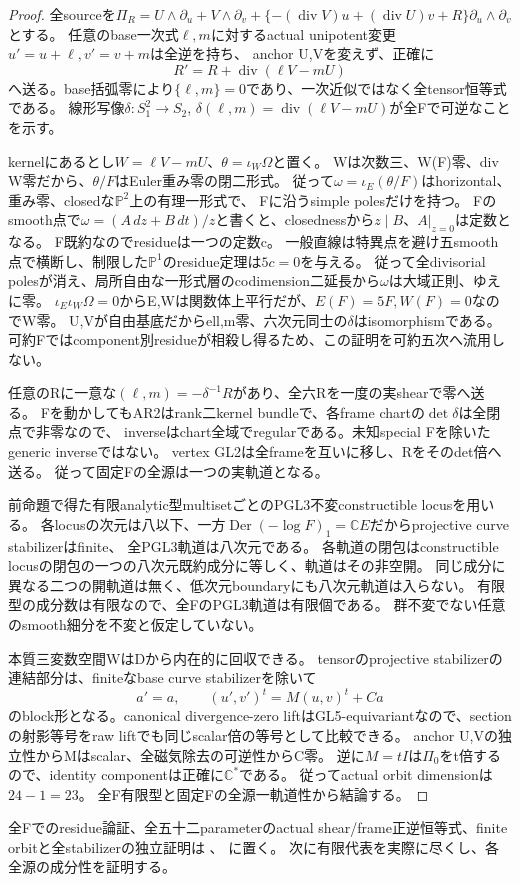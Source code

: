 \documentclass[a4paper,11pt]{ltjsarticle}
\theoremstyle{definition}
\begin{document}
\begin{proof}
全sourceを$\Pi_R=U\wedge\partial_u+V\wedge\partial_v+
\{-(\operatorname{div}V)u+(\operatorname{div}U)v+R\}\partial_u\wedge\partial_v$とする。
任意のbase一次式$\ell,m$に対するactual unipotent変更$u'=u+\ell,v'=v+m$は全逆を持ち、
anchor U,Vを変えず、正確に
\[
 R'=R+\operatorname{div}(\ell V-mU)
\]
へ送る。base括弧零により$\{\ell,m\}=0$であり、一次近似ではなく全tensor恒等式である。
線形写像$\delta:S_1^2\to S_2$, $\delta(\ell,m)=\operatorname{div}(\ell V-mU)$が全Fで可逆なことを示す。

kernelにあるとし$W=\ell V-mU$、$\theta=\iota_W\Omega$と置く。
Wは次数三、W(F)零、div W零だから、$\theta/F$はEuler重み零の閉二形式。
従って$\omega=\iota_E(\theta/F)$はhorizontal、重み零、closedな$\mathbb P^2$上の有理一形式で、
Fに沿うsimple polesだけを持つ。
Fのsmooth点で$\omega=(A\,dz+B\,dt)/z$と書くと、closednessから$z\mid B$、$A|_{z=0}$は定数となる。
F既約なのでresidueは一つの定数c。
一般直線は特異点を避け五smooth点で横断し、制限した$\mathbb P^1$のresidue定理は$5c=0$を与える。
従って全divisorial polesが消え、局所自由な一形式層のcodimension二延長から$\omega$は大域正則、ゆえに零。
$\iota_E\iota_W\Omega=0$からE,Wは関数体上平行だが、$E(F)=5F,W(F)=0$なのでW零。
U,Vが自由基底だからell,m零、六次元同士の$\delta$はisomorphismである。
可約Fではcomponent別residueが相殺し得るため、この証明を可約五次へ流用しない。

任意のRに一意な$(\ell,m)=-\delta^{-1}R$があり、全六Rを一度の実shearで零へ送る。
Fを動かしてもAR2はrank二kernel bundleで、各frame chartの$\det\delta$は全閉点で非零なので、
inverseはchart全域でregularである。未知special Fを除いたgeneric inverseではない。
vertex GL2は全frameを互いに移し、Rをそのdet倍へ送る。
従って固定Fの全源は一つの実軌道となる。

前命題で得た有限analytic型multisetごとのPGL3不変constructible locusを用いる。
各locusの次元は八以下、一方$\operatorname{Der}(-\log F)_1=\mathbb CE$だからprojective curve stabilizerはfinite、
全PGL3軌道は八次元である。
各軌道の閉包はconstructible locusの閉包の一つの八次元既約成分に等しく、軌道はその非空開。
同じ成分に異なる二つの開軌道は無く、低次元boundaryにも八次元軌道は入らない。
有限型の成分数は有限なので、全FのPGL3軌道は有限個である。
群不変でない任意のsmooth細分を不変と仮定していない。

本質三変数空間WはDから内在的に回収できる。
tensorのprojective stabilizerの連結部分は、finiteなbase curve stabilizerを除いて
\[
 a'=a,\qquad (u',v')^t=M(u,v)^t+Ca
\]
のblock形となる。canonical divergence-zero liftはGL5-equivariantなので、sectionの射影等号をraw liftでも同じscalar倍の等号として比較できる。
anchor U,Vの独立性からMはscalar、全磁気除去の可逆性からC零。
逆に$M=tI$は$\Pi_0$をt倍するので、identity componentは正確に$\mathbb C^*$である。
従ってactual orbit dimensionは$24-1=23$。
全F有限型と固定Fの全源一軌道性から結論する。
\end{proof}
全Fでのresidue論証、全五十二parameterのactual shear/frame正逆恒等式、finite orbitと全stabilizerの独立証明は
、
に置く。
次に有限代表を実際に尽くし、各全源の成分性を証明する。
\end{document}
